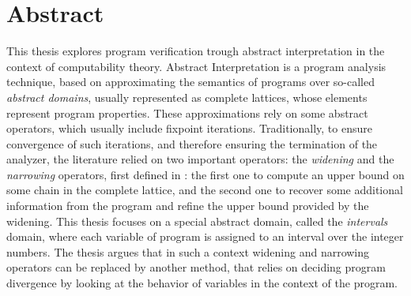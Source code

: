 {}
\begingroup

\chapter*{Abstract}
This thesis explores program verification trough abstract
interpretation in the context of computability theory. Abstract
Interpretation is a program analysis technique, based on approximating
the semantics of programs over so-called \emph{abstract domains},
usually represented as complete lattices, whose elements represent
program properties. These approximations rely on some abstract
operators, which usually include fixpoint iterations. Traditionally,
to ensure convergence of such iterations, and therefore ensuring the
termination of the analyzer, the literature relied on two important
operators: the \emph{widening} and the \emph{narrowing} operators,
first defined in \cite{patrickradiha:one}: the first one to compute an
upper bound on some chain in the complete lattice, and the second one
to recover some additional information from the program and refine the
upper bound provided by the widening. This thesis focuses on a special
abstract domain, called the \emph{intervals} domain, where each
variable of program is assigned to an interval over the integer
numbers. The thesis argues that in such a context widening and
narrowing operators can be replaced by another method, that relies on
deciding program divergence by looking at the behavior of variables in
the context of the program.

\endgroup

\vfill
